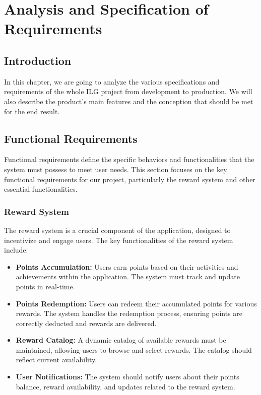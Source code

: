 \chapter{Analysis and Specification of Requirements}

\section{Introduction}
In this chapter, we are going to analyze the various specifications and requirements of the whole ILG project from development to production.
We will also describe the product's main features and the conception that should be met for the end result.


\section{Functional Requirements}
Functional requirements define the specific behaviors and functionalities that the system must possess to meet user needs. This section focuses on the key functional requirements for our project, particularly the reward system and other essential functionalities.

\subsection{Reward System}
The reward system is a crucial component of the application, designed to incentivize and engage users. The key functionalities of the reward system include:

\begin{itemize}
    \item \textbf{Points Accumulation:} Users earn points based on their activities and achievements within the application. The system must track and update points in real-time.
    \item \textbf{Points Redemption:} Users can redeem their accumulated points for various rewards. The system handles the redemption process, ensuring points are correctly deducted and rewards are delivered.
    \item \textbf{Reward Catalog:} A dynamic catalog of available rewards must be maintained, allowing users to browse and select rewards. The catalog should reflect current availability.
    \item \textbf{User Notifications:} The system should notify users about their points balance, reward availability, and updates related to the reward system.
\end{itemize}

